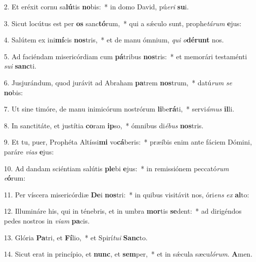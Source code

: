
2. Et eréxit cornu sa\textbf{lú}tis \textbf{no}bis:~* in domo David, pú\textit{e}\textit{ri} \textbf{su}i.

3. Sicut locútus est per \textbf{os} sanc\textbf{tó}rum,~* qui a s\'{\ae}culo sunt, prophe\textit{tá}\textit{rum} \textbf{e}jus:

4. Salútem ex ini\textbf{mí}cis \textbf{nos}tris,~* et de manu ómnium, \textit{qui} \textit{o}\textbf{dé}\textbf{runt} nos.

5. Ad faciéndam misericórdiam cum \textbf{pá}tribus \textbf{nos}tris:~* et memorári testaménti \textit{su}\textit{i} \textbf{sanc}ti.

6. Jusjurándum, quod jurávit ad Abraham \textbf{pa}trem \textbf{nos}trum,~* datú\textit{rum} \textit{se} \textbf{no}bis:

7. Ut sine timóre, de manu inimicórum nostrórum \textbf{li}be\textbf{rá}ti,~* servi\textit{á}\textit{mus} \textbf{il}li.

8. In sanctitáte, et justítia \textbf{co}ram \textbf{ip}so,~* ómnibus di\textit{é}\textit{bus} \textbf{nos}tris.

9. Et tu, puer, Prophéta Altíssi\textbf{mi} vo\textbf{cá}beris:~* præíbis enim ante fáciem Dómini, paráre \textit{vi}\textit{as} \textbf{e}jus:

10. Ad dandam sciéntiam salútis \textbf{ple}bi \textbf{e}jus:~* in remissiónem peccató\textit{rum} \textit{e}\textbf{ó}rum:

11. Per víscera misericórdiæ \textbf{De}i \textbf{nos}tri:~* in quibus visitávit nos, óri\textit{ens} \textit{ex} \textbf{al}to:

12. Illumináre his, qui in ténebris, et in umbra \textbf{mor}tis \textbf{se}dent:~* ad dirigéndos pedes nostros in \textit{vi}\textit{am} \textbf{pa}cis.

13. Glória \textbf{Pa}tri, et \textbf{Fí}lio,~* et Spirí\textit{tu}\textit{i} \textbf{Sanc}to.

14. Sicut erat in princípio, et \textbf{nunc}, et \textbf{sem}per,~* et in s\'{\ae}cula sæcu\textit{ló}\textit{rum}. \textbf{A}men.